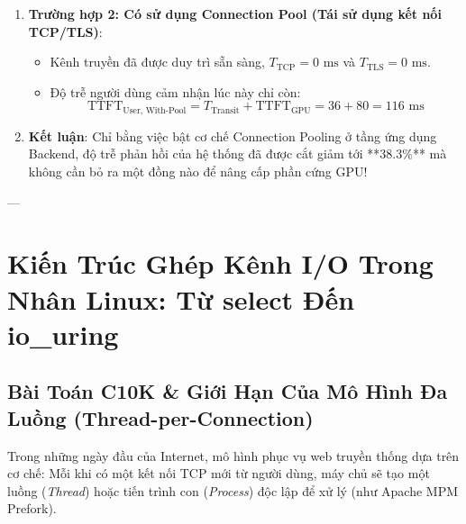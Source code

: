 \begin{example}
\begin{enumerate}
  \item \textbf{Trường hợp 2: Có sử dụng Connection Pool (Tái sử dụng kết nối TCP/TLS)}:
  \begin{itemize}
    \item Kênh truyền đã được duy trì sẵn sàng, $T_{\text{TCP}} = 0\text{ ms}$ và $T_{\text{TLS}} = 0\text{ ms}$.
    \item Độ trễ người dùng cảm nhận lúc này chỉ còn:
    \begin{equation*}
    \text{TTFT}_{\text{User, With-Pool}} = T_{\text{Transit}} + \text{TTFT}_{\text{GPU}} = 36 + 80 = 116\text{ ms}
    \end{equation*}
  \end{itemize}
  \item \textbf{Kết luận}: Chỉ bằng việc bật cơ chế Connection Pooling ở tầng ứng dụng Backend, độ trễ phản hồi của hệ thống đã được cắt giảm tới **$38.3\%$** mà không cần bỏ ra một đồng nào để nâng cấp phần cứng GPU!
\end{enumerate}
\end{example}

---

\section{Kiến Trúc Ghép Kênh I/O Trong Nhân Linux: Từ select Đến io\_uring}
\label{sec:linux-io-multiplexing}

\subsection{Bài Toán C10K \& Giới Hạn Của Mô Hình Đa Luồng (Thread-per-Connection)}
Trong những ngày đầu của Internet, mô hình phục vụ web truyền thống dựa trên cơ chế: Mỗi khi có một kết nối TCP mới từ người dùng, máy chủ sẽ tạo một luồng (\textit{Thread}) hoặc tiến trình con (\textit{Process}) độc lập để xử lý (như Apache MPM Prefork).

